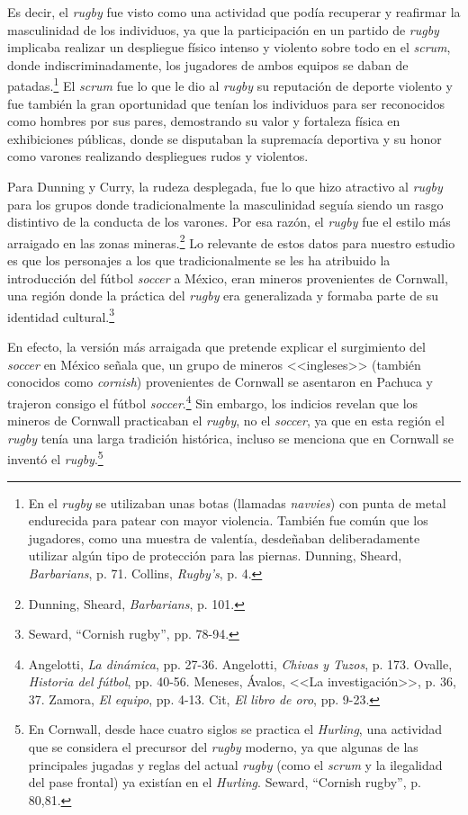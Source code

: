 \documentclass[11pt,a5paper,twoside]{book} %
\begin{document}
Es decir, el \emph{rugby} fue visto como una actividad que podía recuperar y reafirmar la masculinidad de los individuos, ya que la participación en un partido de \emph{rugby} implicaba realizar un despliegue físico intenso y violento sobre todo en el \emph{scrum}, donde indiscriminadamente, los jugadores de ambos equipos se daban de patadas.\footnote{En el \emph{rugby} se utilizaban unas botas (llamadas \emph{navvies}) con punta de metal endurecida para patear con mayor violencia. También fue común que los jugadores, como una muestra de valentía, desdeñaban deliberadamente utilizar algún tipo de protección para las piernas. Dunning, Sheard, \emph{Barbarians}, p. 71. Collins, \emph{Rugby's}, p. 4.} El \emph{scrum} fue lo que le dio al \emph{rugby} su reputación de deporte violento y fue también la gran oportunidad que tenían los individuos para ser reconocidos como hombres por sus pares, demostrando su valor y fortaleza física en exhibiciones públicas, donde se disputaban la supremacía deportiva y su honor como varones realizando despliegues rudos y violentos.

Para Dunning y Curry, la rudeza desplegada, fue lo que hizo atractivo al \emph{rugby} para los grupos donde tradicionalmente la masculinidad seguía siendo un rasgo distintivo de la conducta de los varones. Por esa razón, el \emph{rugby} fue el estilo más arraigado en las zonas mineras.\footnote{Dunning, Sheard, \emph{Barbarians}, p. 101.} Lo relevante de estos datos para nuestro estudio es que los personajes a los que tradicionalmente se les ha atribuido la introducción del fútbol \emph{soccer} a México, eran mineros provenientes de Cornwall, una región donde la práctica del \emph{rugby} era generalizada y formaba parte de su identidad cultural.\footnote{Seward, ``Cornish rugby'', pp. 78-94.}

En efecto, la versión más arraigada que pretende explicar el surgimiento del \emph{soccer} en México señala que, un grupo de mineros <<ingleses>> (también conocidos como \emph{cornish}) provenientes de Cornwall se asentaron en Pachuca y trajeron consigo el fútbol \emph{soccer}.\footnote{Angelotti, \emph{La dinámica}, pp. 27-36. Angelotti, \emph{Chivas y Tuzos}, p. 173. Ovalle, \emph{Historia del fútbol}, pp. 40-56. Meneses, Ávalos, <<La investigación>>, p. 36, 37. Zamora, \emph{El equipo}, pp. 4-13. Cit, \emph{El libro de oro}, pp. 9-23.} Sin embargo, los indicios revelan que los mineros de Cornwall practicaban el \emph{rugby}, no el \emph{soccer}, ya que en esta región el \emph{rugby} tenía una larga tradición histórica, incluso se menciona que en Cornwall se inventó el \emph{rugby}.\footnote{En Cornwall, desde hace cuatro siglos se practica el \emph{Hurling}, una actividad que se considera el precursor del \emph{rugby} moderno, ya que algunas de las principales jugadas y reglas del actual \emph{rugby} (como el \emph{scrum} y la ilegalidad del pase frontal) ya existían en el \emph{Hurling}. Seward, ``Cornish rugby'', p. 80,81.}
\end{document}
